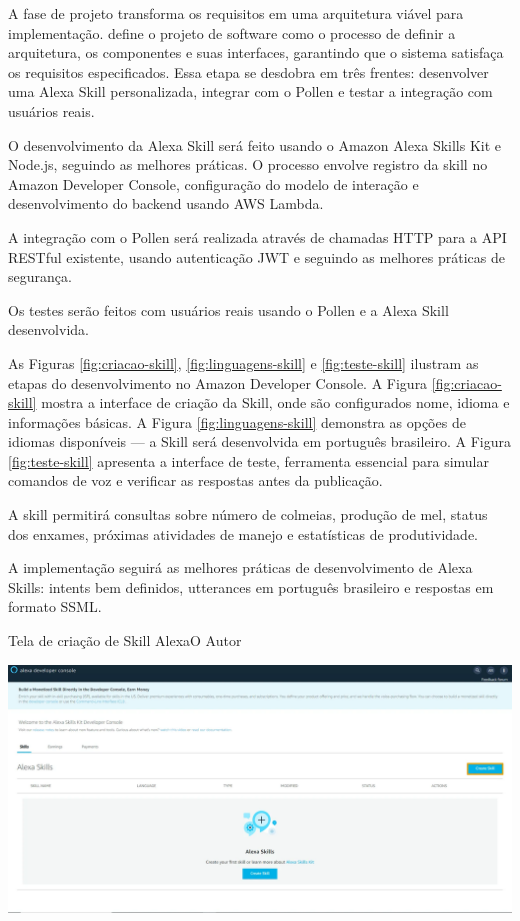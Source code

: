\label{sssec:proj-sistema}

A fase de projeto transforma os requisitos em uma arquitetura viável para implementação. \textcite{sommerville2011} define o projeto de software como o processo de definir a arquitetura, os componentes e suas interfaces, garantindo que o sistema satisfaça os requisitos especificados. Essa etapa se desdobra em três frentes: desenvolver uma Alexa Skill personalizada, integrar com o Pollen e testar a integração com usuários reais.

O desenvolvimento da Alexa Skill será feito usando o Amazon Alexa Skills Kit e Node.js, seguindo as melhores práticas. O processo envolve registro da skill no Amazon Developer Console, configuração do modelo de interação e desenvolvimento do backend usando AWS Lambda.

A integração com o Pollen será realizada através de chamadas HTTP para a API RESTful existente, usando autenticação JWT e seguindo as melhores práticas de segurança. 

Os testes serão feitos com usuários reais usando o Pollen e a Alexa Skill desenvolvida.

As Figuras \ref{fig:criacao-skill}, \ref{fig:linguagens-skill} e \ref{fig:teste-skill} ilustram as etapas do desenvolvimento no Amazon Developer Console. A Figura \ref{fig:criacao-skill} mostra a interface de criação da Skill, onde são configurados nome, idioma e informações básicas. A Figura \ref{fig:linguagens-skill} demonstra as opções de idiomas disponíveis — a Skill será desenvolvida em português brasileiro. A Figura \ref{fig:teste-skill} apresenta a interface de teste, ferramenta essencial para simular comandos de voz e verificar as respostas antes da publicação.

A skill permitirá consultas sobre número de colmeias, produção de mel, status dos enxames, próximas atividades de manejo e estatísticas de produtividade.

A implementação seguirá as melhores práticas de desenvolvimento de Alexa Skills: intents bem definidos, utterances em português brasileiro e respostas em formato SSML.

\begin{figura}{Tela de criação de Skill Alexa}{O Autor}
    \begin{flushleft}
        \label{fig:criacao-skill}
        \includegraphics[width=0.85\linewidth]{resources/floats/ilustracoes/tela_criacao_skill_alexa.png}
    \end{flushleft}
\end{figura}

